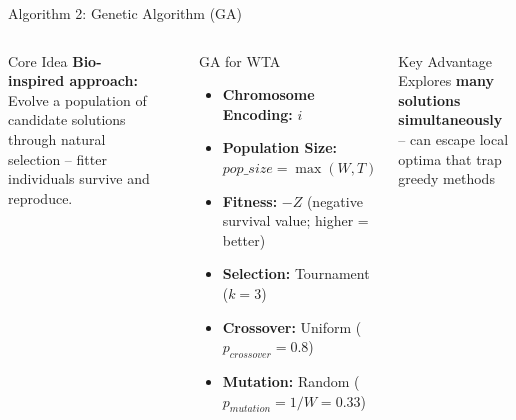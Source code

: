 \documentclass[aspectratio=43,8pt]{beamer}
\begin{document}
\begin{frame}{Algorithm 2: Genetic Algorithm (GA)}
\begin{columns}[t]
\begin{block}{Core Idea}
\textbf{Bio-inspired approach:} Evolve a population of candidate solutions through natural selection -- fitter individuals survive and reproduce.
\end{block}

\vspace{0.2cm}
\begin{center}
\end{center}

\begin{exampleblock}{GA for WTA}
\begin{itemize}
    \item \textbf{Chromosome Encoding:} $i$
    \item \textbf{Population Size:} $pop\_size = \max(W, T)$
    \item \textbf{Fitness:} $-Z$ (negative survival value; higher = better)
    \item \textbf{Selection:} Tournament ($k=3$)
    \item \textbf{Crossover:} Uniform ($p_{crossover} = 0.8$)
    \item \textbf{Mutation:} Random ($p_{mutation} = 1/W = 0.33$)
\end{itemize}
\end{exampleblock}

\begin{alertblock}{Key Advantage}
Explores \textbf{many solutions simultaneously} -- can escape local optima that trap greedy methods
\end{alertblock}
\end{columns}
\end{frame}
\end{document}
